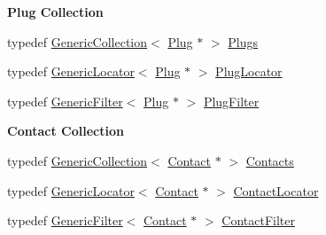 \begin{Indent}\textbf{ Plug Collection}\par
\begin{DoxyCompactItemize}
\item 
typedef \mbox{\hyperlink{classHurricane_1_1GenericCollection}{Generic\+Collection}}$<$ \mbox{\hyperlink{classHurricane_1_1Plug}{Plug}} $\ast$ $>$ \mbox{\hyperlink{namespaceHurricane_ac8335d2057483ee7a935c15a9460c64f}{Plugs}}
\item 
typedef \mbox{\hyperlink{classHurricane_1_1GenericLocator}{Generic\+Locator}}$<$ \mbox{\hyperlink{classHurricane_1_1Plug}{Plug}} $\ast$ $>$ \mbox{\hyperlink{namespaceHurricane_a99a5e89f593de242e24a24b632b0534e}{Plug\+Locator}}
\item 
typedef \mbox{\hyperlink{classHurricane_1_1GenericFilter}{Generic\+Filter}}$<$ \mbox{\hyperlink{classHurricane_1_1Plug}{Plug}} $\ast$ $>$ \mbox{\hyperlink{namespaceHurricane_ad6b0bd4bdff4c52e6163b9f54e3e5c92}{Plug\+Filter}}
\end{DoxyCompactItemize}
\end{Indent}
\begin{Indent}\textbf{ Contact Collection}\par
\begin{DoxyCompactItemize}
\item 
typedef \mbox{\hyperlink{classHurricane_1_1GenericCollection}{Generic\+Collection}}$<$ \mbox{\hyperlink{classHurricane_1_1Contact}{Contact}} $\ast$ $>$ \mbox{\hyperlink{namespaceHurricane_a1e6a8ab09f688509bd727b3fee02d0d2}{Contacts}}
\item 
typedef \mbox{\hyperlink{classHurricane_1_1GenericLocator}{Generic\+Locator}}$<$ \mbox{\hyperlink{classHurricane_1_1Contact}{Contact}} $\ast$ $>$ \mbox{\hyperlink{namespaceHurricane_a244811a7f36de747884f0c1ab1cc1025}{Contact\+Locator}}
\item 
typedef \mbox{\hyperlink{classHurricane_1_1GenericFilter}{Generic\+Filter}}$<$ \mbox{\hyperlink{classHurricane_1_1Contact}{Contact}} $\ast$ $>$ \mbox{\hyperlink{namespaceHurricane_a57f79232601d8739370debec00f89740}{Contact\+Filter}}
\end{DoxyCompactItemize}
\end{Indent}
